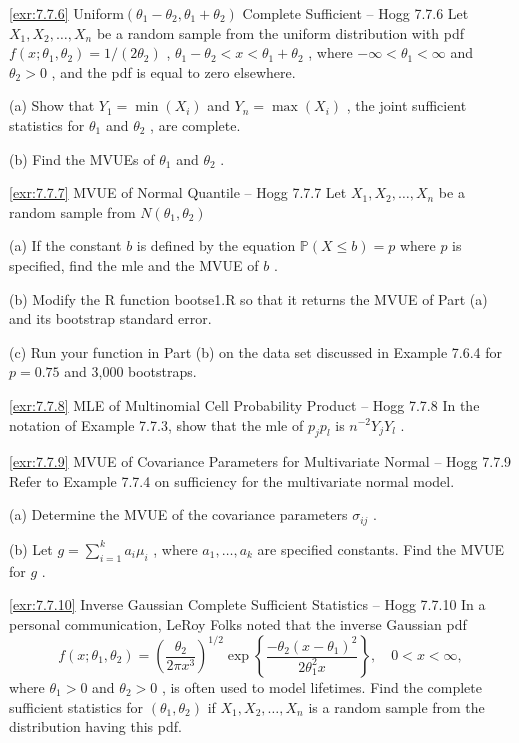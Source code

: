 \begin{exercise}{\ref{exr:7.7.6} Uniform$(\theta_{1} - \theta_{2}, \theta_{1} + \theta_{2})$ Complete Sufficient – Hogg 7.7.6}\label{exr:7.7.6}
Let $X_1, X_2, \ldots, X_n$ be a random sample from the uniform distribution with pdf $f(x; \theta_1, \theta_2) = 1 / (2\theta_2)$ , $\theta_1 - \theta_2 < x < \theta_1 + \theta_2$ , where $-\infty < \theta_1 < \infty$ and $\theta_2 > 0$ , and the pdf is equal to zero elsewhere.

(a) Show that $Y_{1} = \min(X_{i})$ and $Y_{n} = \max(X_{i})$ , the joint sufficient statistics for $\theta_{1}$ and $\theta_{2}$ , are complete.

(b) Find the MVUEs of $\theta_{1}$ and $\theta_{2}$ .
\end{exercise}

\begin{exercise}{\ref{exr:7.7.7} MVUE of Normal Quantile – Hogg 7.7.7}\label{exr:7.7.7}
Let $X_{1},X_{2},\ldots ,X_{n}$ be a random sample from $N(\theta_1,\theta_2)$

(a) If the constant $b$ is defined by the equation $\mathbb{P}(X \leq b) = p$ where $p$ is specified, find the mle and the MVUE of $b$ .

(b) Modify the R function bootse1.R so that it returns the MVUE of Part (a) and its bootstrap standard error.

(c) Run your function in Part (b) on the data set discussed in Example 7.6.4 for $p = 0.75$ and 3,000 bootstraps.
\end{exercise}

\begin{exercise}{\ref{exr:7.7.8} MLE of Multinomial Cell Probability Product – Hogg 7.7.8}\label{exr:7.7.8}
In the notation of Example 7.7.3, show that the mle of $p_j p_l$ is $n^{-2} Y_j Y_l$ .
\end{exercise}

\begin{exercise}{\ref{exr:7.7.9} MVUE of Covariance Parameters for Multivariate Normal – Hogg 7.7.9}\label{exr:7.7.9}
Refer to Example 7.7.4 on sufficiency for the multivariate normal model.

(a) Determine the MVUE of the covariance parameters $\sigma_{ij}$ .

(b) Let $g = \sum_{i=1}^{k} a_i \mu_i$ , where $a_1, \ldots, a_k$ are specified constants. Find the MVUE for $g$ .
\end{exercise}

\begin{exercise}{\ref{exr:7.7.10} Inverse Gaussian Complete Sufficient Statistics – Hogg 7.7.10}\label{exr:7.7.10}
In a personal communication, LeRoy Folks noted that the inverse Gaussian pdf
\[
f(x; \theta_1, \theta_2) = \left(\frac{\theta_2}{2\pi x^3}\right)^{1/2} \exp\left\{\frac{-\theta_2(x - \theta_1)^2}{2\theta_1^2 x}\right\}, \quad 0 < x < \infty ,
\]
where $\theta_{1} > 0$ and $\theta_{2} > 0$ , is often used to model lifetimes. Find the complete sufficient statistics for $(\theta_{1},\theta_{2})$ if $X_{1},X_{2},\ldots,X_{n}$ is a random sample from the distribution having this pdf.
\end{exercise}

